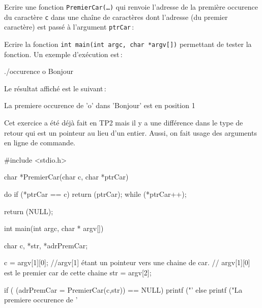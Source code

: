 \documentclass[10pt]{article}\usepackage[nu,correction]{esial}
\begin{document}
 


\bigskip\bigskip{}

\Question
Ecrire une fonction {\tt PremierCar(\ldots)} qui renvoie l'adresse de
la première occurence du 
caractère {\tt c} dans une chaîne de caractères dont l'adresse (du
premier caractère) est passé à l'argument {\tt ptrCar}\,:


\Question
Ecrire la fonction {\tt int main(int argc, char *argv[])} permettant
de tester la fonction. Un exemple d'exécution est\,:

\medskip

\begin{boxedverbatim}
./occurence  o Bonjour
\end{boxedverbatim}

\medskip

Le résultat affiché est le suivant\,:

\medskip

\begin{boxedverbatim}
La premiere occurence de 'o' dans 'Bonjour' est en position 1
\end{boxedverbatim}

\begin{Reponse}
  Cet exercice a été déjà fait en TP2 mais il y a une différence dans
  le type de retour qui est un pointeur au lieu d'un entier. Aussi, on
  fait usage des arguments en ligne de commande.

\begin{boxedverbatim}
#include <stdio.h>

char *PremierCar(char c, char *ptrCar){
  do
    if (*ptrCar == c)
      return (ptrCar);
  while (*ptrCar++);

  return (NULL);
}

int main(int argc, char * argv[]){

  char c, *str, *adrPremCar;

  c = argv[1][0]; //argv[1] étant un pointeur vers une chaine de car.
                  // argv[1][0] est le premier car de cette chaine
  str = argv[2];

  if ( (adrPremCar = PremierCar(c,str)) == NULL) 
    printf ("'%
  else
    printf ("La premiere occurence de '%
}
\end{boxedverbatim}
\end{Reponse}
    
\end{document}
